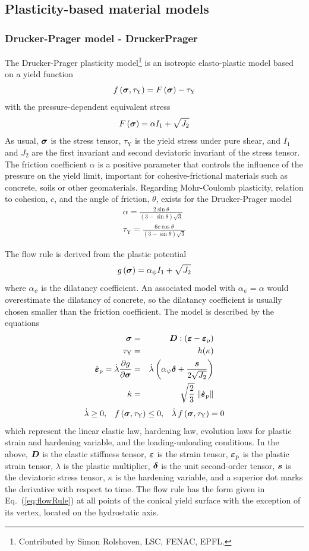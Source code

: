 \documentclass[a4paper]{article}
\newcommand{\mbf}[1]{\mbox{\boldmath$#1$}}
\newcommand{\be}{\begin{equation}}
\newcommand{\ee}{\end{equation}}
\newcommand{\bea}{\begin{eqnarray}}
\newcommand{\eea}{\end{eqnarray}}
\newcommand{\bsig}{\mbf{\sigma}}
\newcommand{\alphaPsi}{\alpha_{\psi}}
\newcommand{\tauY}{\tau_{\mathrm {Y}}}
\newcommand{\eps} {\mbf{\varepsilon}}
\newcommand{\epsp} {\eps_{\mathrm{p}}}
\newcommand{\epspd} {\dot{\eps}_{\mathrm{p}}}
\begin{document}
\subsection{Plasticity-based material models}

\subsubsection{Drucker-Prager model - DruckerPrager}
\label{DPmodel}
The Drucker-Prager plasticity model\footnote{Contributed by Simon Rolshoven, LSC, FENAC, EPFL.} is an isotropic elasto-plastic model based
on a yield function
\be
f \left(\bsig, \tauY\right) = F\left(\bsig\right) - \tauY
\ee
with the pressure-dependent equivalent stress
\be
\label{eq:equivalentStress}
F\left(\bsig\right) = \alpha I_1 + \sqrt{J_2}
\ee
As usual, $\bsig$ is the stress tensor, $\tauY$ is the yield stress
under pure shear, and $I_1$ and $J_2$ are the first invariant and second
deviatoric invariant of the stress tensor.
The friction coefficient $\alpha$ is a positive parameter that
controls the influence of the pressure on the yield limit, important for
cohesive-frictional materials such as concrete, soils or other
geomaterials. Regarding Mohr-Coulomb plasticity, relation to cohesion, $c$, and 
the angle of friction, $\theta$, exists for the Drucker-Prager model
\bea
\alpha = \frac{2\sin\theta}{(3-\sin\theta)\sqrt{3}}\\
\tauY = \frac{6c\cos\theta}{(3-\sin\theta)\sqrt{3}}
\eea 

The flow rule is derived from the plastic potential
\be
g\left(\bsig\right) = \alphaPsi I_1 + \sqrt{J_2}
\ee
where $\alphaPsi$ is the dilatancy coefficient. An associated
model with $\alphaPsi=\alpha$ would overestimate the dilatancy of
concrete, so the dilatancy coefficient is usually chosen smaller than the
friction coefficient.
The model is described by the equations
\bea
\label{eq:elasticLaw}
\bsig & = &\mbf{D} : \left(\eps - \epsp \right)
\\
\label{eq:softeningLaw}
\tauY & = & h(\kappa)
\\
\label{eq:flowRule}
\epspd = \dot{\lambda} \frac{\partial g}{\partial \bsig} & = &
\dot{\lambda} \left( \alphaPsi \mbf{\delta} + \frac{\mbf{s}}{2\sqrt{J_2}} \right)
\\
\label{eq:hardening}
\dot{\kappa} & = & \sqrt{\frac{2}{3}} \; \| \epspd \|
\eea
\be
\label{eq:loading}
\dot{\lambda} \ge 0, \;\;\; f \left(\bsig, \tauY\right) \le 0, \;\;\; \dot{\lambda}\, f \left(\bsig, \tauY\right)  = 0
\ee
which represent the linear elastic law, hardening law, evolution laws
for plastic strain and hardening variable,  and the
loading-unloading conditions.
In the above, $\mbf{D}$ is the elastic stiffness
tensor, $\eps$ is the strain tensor, $\epsp$ is the plastic strain tensor,
$\lambda$ is the plastic multiplier, $\mbf{\delta}$ is the unit
second-order tensor, $\mbf{s}$ is the
deviatoric stress tensor, $\kappa$ is the hardening variable, and a
superior dot marks the derivative with respect to time.
The flow rule has the form given in Eq.~(\ref{eq:flowRule}) at all
points of the conical yield surface with the exception of its vertex,
located on the hydrostatic axis.
\end{document}
